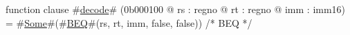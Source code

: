 function clause #\hyperref[zdecode]{decode}# (0b000100 @ rs : regno @ rt : regno @ imm : imm16) =
  #\hyperref[zSome]{Some}#(#\hyperref[zBEQ]{BEQ}#(rs, rt, imm, false, false))  /* BEQ  */
